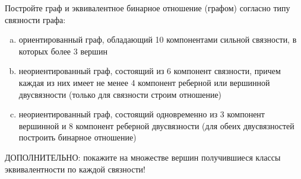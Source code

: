 \question 
Постройте граф и эквивалентное бинарное отношение (графом) согласно типу связности графа:\\
\begin{enumerate} [a)]\setcounter{enumi}{0}
\item ориентированный граф, обладающий 10 компонентами сильной связности, в которых более 3 вершин
\item неориентированный граф, состоящий из 6 компонент связности, причем каждая из них имеет не менее 4 компонент реберной или вершинной двусвязности (только для связности строим отношение)
\item неориентированный граф, состоящий одновременно из 3 компонент вершинной и 8 компонент реберной двусвязности (для обеих двусвязностей построить бинарное отношение)
\end{enumerate} 
ДОПОЛНИТЕЛЬНО: покажите на множестве вершин получившиеся классы эквивалентности по каждой связности!